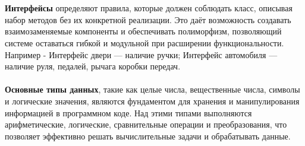 \documentclass[a4paper, 12pt]{report}
\numberwithin{equation}{section}
\begin{document}
	\\\\
	\textbf{Интерфейсы} определяют правила, которые должен соблюдать класс, описывая набор методов без их конкретной реализации. Это даёт возможность создавать взаимозаменяемые компоненты и обеспечивать полиморфизм, позволяющий системе оставаться гибкой и модульной при расширении функциональности.
	Например - Интерфейс двери — наличие ручки; Интерфейс автомобиля — наличие руля, педалей, рычага коробки передач.
	\\\\
	\textbf{Основные типы данных}, такие как целые числа, вещественные числа, символы и логические значения, являются фундаментом для хранения и манипулирования информацией в программном коде. Над этими типами выполняются арифметические, логические, сравнительные операции и преобразования, что позволяет эффективно решать вычислительные задачи и обрабатывать данные.
	
	
\end{document}
